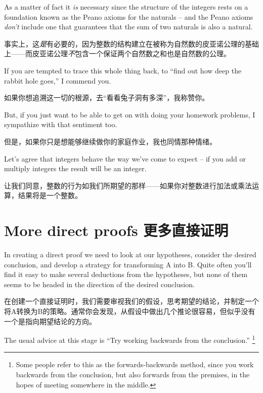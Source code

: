 As a matter of fact it {\em is} necessary since the structure of the integers
rests on a foundation known as the Peano axioms for the naturals -- and the Peano axioms
      {\em don't} include one that guarantees that the sum of two naturals is also a natural.

事实上，这{\em 是}有必要的，因为整数的结构建立在被称为自然数的皮亚诺公理的基础上——而皮亚诺公理{\em 不}包含一个保证两个自然数之和也是自然数的公理。

If you
are tempted to trace this whole thing back, to ``find out how deep the rabbit hole goes,'' I commend
you.

如果你想追溯这一切的根源，去“看看兔子洞有多深”，我称赞你。

But, if you just want to be able to get on with doing your homework problems, I sympathize
with that sentiment too.

但是，如果你只是想能够继续做你的家庭作业，我也同情那种情绪。

Let's agree that integers behave the way we've come to expect -- if
you add or multiply integers the result will be an integer.

让我们同意，整数的行为如我们所期望的那样——如果你对整数进行加法或乘法运算，结果将是一个整数。

\newpage




\newpage


\section{More direct proofs 更多直接证明}
\label{sec:more}

In creating a direct proof we need to look at our hypotheses, consider
the desired conclusion, and develop a strategy for transforming A into B.
Quite often you'll find it easy to make several deductions from the
hypotheses, but none of them seems to be headed in the direction of
the desired conclusion.

在创建一个直接证明时，我们需要审视我们的假设，思考期望的结论，并制定一个将A转换为B的策略。通常你会发现，从假设中做出几个推论很容易，但似乎没有一个是指向期望结论的方向。

The usual advice at this stage is
``Try working backwards from the conclusion.''
\footnote{Some people refer to this as the forwards-backwards method, since %
      you work backwards from the conclusion, but also forwards from the premises, %
      in the hopes of meeting somewhere in the middle.}

